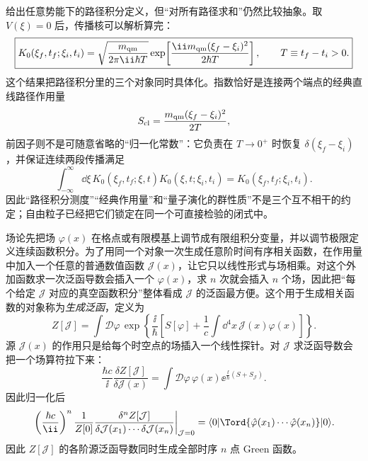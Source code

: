 \begin{exbox}[自由粒子传播核]
 给出任意势能下的路径积分定义，但“对所有路径求和”仍然比较抽象。取 $V(\xi)=0$ 后，传播核可以解析算完：
\begin{equation}
 \boxed{
 K_0(\xi_f,t_f;\xi_i,t_i)
 =\sqrt{\frac{m_{\rm qm}}{2\pi\ii\hbar T}}
 \exp\!\left[
 \frac{\ii m_{\rm qm}(\xi_f-\xi_i)^2}{2\hbar T}
 \right],
 \qquad T\equiv t_f-t_i>0.}
 \label{eq:free-particle-kernel-dp61}
\end{equation}
这个结果把路径积分里的三个对象同时具体化。指数恰好是连接两个端点的经典直线路径作用量
\begin{equation*}
 S_{\rm cl}
 =\frac{m_{\rm qm}(\xi_f-\xi_i)^2}{2T},
\end{equation*}
前因子则不是可随意省略的“归一化常数”：它负责在 $T\to0^+$ 时恢复 $\delta(\xi_f-\xi_i)$，并保证连续两段传播满足
\begin{equation}
 \boxed{
 \int_{-\infty}^{\infty}\dd\xi\,
 K_0(\xi_f,t_f;\xi,t)
 K_0(\xi,t;\xi_i,t_i)
 =K_0(\xi_f,t_f;\xi_i,t_i).}
 \label{eq:free-kernel-composition-dp61}
\end{equation}
因此“路径积分测度”“经典作用量”和“量子演化的群性质”不是三个互不相干的约定；自由粒子已经把它们锁定在同一个可直接检验的闭式中。
\end{exbox}



场论先把场 $\varphi(x)$ 在格点或有限模基上调节成有限组积分变量，并以调节极限定义连续函数积分。为了用同一个对象一次生成任意阶时间有序相关函数，在作用量中加入一个任意的普通数值函数 $\mathcal J(x)$，让它只以线性形式与场相乘。对这个外加函数求一次泛函导数会插入一个 $\varphi(x)$，求 $n$ 次就会插入 $n$ 个场，因此把“每个给定 $\mathcal J$ 对应的真空函数积分”整体看成 $\mathcal J$ 的泛函最方便。这个用于生成相关函数的对象称为\emph{生成泛函}，定义为
\begin{equation}
 Z[\mathcal J]
 =\int\mathcal D\varphi\,
 \exp\left\{\frac{\ii}{\hbar}
 \left[S[\varphi]+\frac1c\int\dd^4 x\,\mathcal J(x)\varphi(x)\right]\right\}.
 \label{eq:scalar-ZJ-r3}
\end{equation}
源 $\mathcal J(x)$ 的作用只是给每个时空点的场插入一个线性探针。对 $\mathcal J$ 求泛函导数会把一个场算符拉下来：
\begin{equation*}
 \frac{\hbar c}{\ii}\frac{\delta Z[\mathcal J]}{\delta \mathcal J(x)}
 =\int\mathcal D\varphi\,\varphi(x)
 \ee^{\frac{\ii}{\hbar}(S+S_\mathcal J)}.
\end{equation*}
因此归一化后
\begin{equation}
 \left.\left(\frac{\hbar c}{\ii}\right)^n
 \frac{1}{Z[0]}
 \frac{\delta^n Z[\mathcal J]}{\delta \mathcal J(x_1)\cdots\delta \mathcal J(x_n)}
 \right|_{\mathcal J=0}
 =\langle0|\Tord\{\hat\varphi(x_1)\cdots\hat\varphi(x_n)\}|0\rangle.
 \label{eq:ZJ-correlators-r3}
\end{equation}
因此 $Z[\mathcal J]$ 的各阶源泛函导数同时生成全部时序 $n$ 点 Green 函数。

